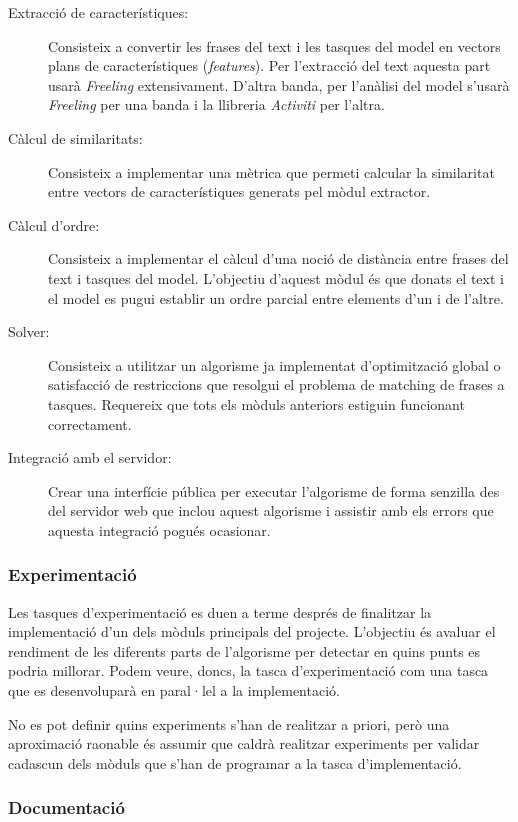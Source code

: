 \begin{description}
    \item[Extracció de característiques:]{Consisteix a convertir les frases del text i les tasques del model en vectors plans de característiques (\emph{features}). Per l'extracció del text aquesta part usarà \emph{Freeling} extensivament. D'altra banda, per l'anàlisi del model s'usarà \emph{Freeling} per una banda i la llibreria \emph{Activiti} per l'altra.}
    \item[Càlcul de similaritats:]{Consisteix a implementar una mètrica que permeti calcular la similaritat entre vectors de característiques generats pel mòdul extractor.}
    \item[Càlcul d'ordre:]{Consisteix a implementar el càlcul d'una noció de distància entre frases del text i tasques del model. L'objectiu d'aquest mòdul és que donats el text i el model es pugui establir un ordre parcial entre elements d'un i de l'altre.}
    \item[Solver:]{Consisteix a utilitzar un algorisme ja implementat d'optimització global o satisfacció de restriccions que resolgui el problema de matching de frases a tasques. Requereix que tots els mòduls anteriors estiguin funcionant correctament.}
    \item[Integració amb el servidor:]{Crear una interfície pública per executar l'algorisme de forma senzilla des del servidor web que inclou aquest algorisme i assistir amb els errors que aquesta integració pogués ocasionar.}
\end{description}

\subsubsection{Experimentació}

Les tasques d'experimentació es duen a terme després de finalitzar la implementació d'un dels mòduls principals del projecte. L'objectiu és avaluar el rendiment de les diferents parts de l'algorisme per detectar en quins punts es podria millorar. Podem veure, doncs, la tasca d'experimentació com una tasca que es desenvoluparà en paral·lel a la implementació.

No es pot definir quins experiments s'han de realitzar a priori, però una aproximació raonable és assumir que caldrà realitzar experiments per validar cadascun dels mòduls que s'han de programar a la tasca d'implementació. 

\subsubsection{Documentació}

